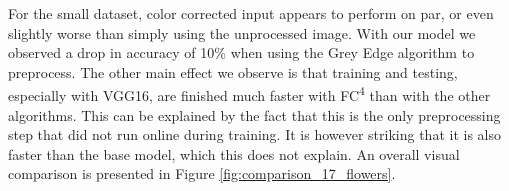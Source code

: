 For the small dataset, color corrected input appears to perform on par, or even slightly worse than simply using the unprocessed image.
With our model we observed a drop in accuracy of 10\% when using the Grey Edge algorithm to preprocess. The other main effect we observe
is that training and testing, especially with VGG16, are finished much faster with FC\textsuperscript{4} than with the other algorithms.
This can be explained by the fact that this is the only preprocessing step that did not run online during training. It is however striking
that it is also faster than the base model, which this does not explain.
An overall visual comparison is presented in Figure \ref{fig:comparison_17_flowers}.

\def\historygraphheight{3.8cm}

\ourssmalltrainacc
{}\ourssmallvalacc

